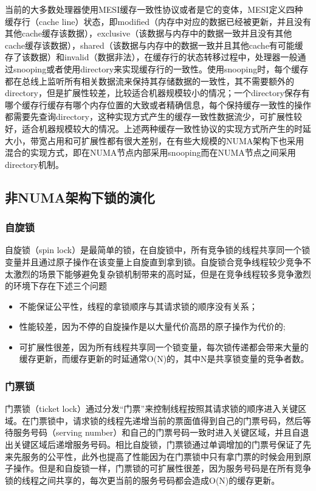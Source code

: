 当前的大多数处理器使用MESI\cite{papamarcos1984low}缓存一致性协议或者是它的变体，MESI定义四种缓存行（cache line）状态，即modified（内存中对应的数据已经被更新，并且没有其他cache缓存该数据），exclusive（该数据与内存中的数据一致并且没有其他cache缓存该数据），shared（该数据与内存中的数据一致并且其他cache有可能缓存了该数据）和invalid（数据非法），在缓存行的状态转移过程中，处理器一般通过snooping或者使用directory来实现缓存行的一致性。使用snooping时，每个缓存都在总线上监听所有相关数据流来保持其存储数据的一致性，其不需要额外的directory，但是扩展性较差，比较适合机器规模较小的情况；一个directory保存有哪个缓存行缓存有哪个内存位置的大致或者精确信息，每个保持缓存一致性的操作都需要先查询directory，这种实现方式产生的缓存一致性数据流少，可扩展性较好，适合机器规模较大的情况。上述两种缓存一致性协议的实现方式所产生的时延大小，带宽占用和可扩展性都有很大差别，在有些大规模的NUMA架构下也采用混合的实现方式，即在NUMA节点内部采用snooping而在NUMA节点之间采用directory机制。
\subsection{非NUMA架构下锁的演化}
\subsubsection{自旋锁}
自旋锁（spin lock）\cite{anderson1990performance}\cite{mellor1991algorithms}\cite{scott2013shared}是最简单的锁，在自旋锁中，所有竞争锁的线程共享同一个锁变量并且通过原子操作在该变量上自旋直到拿到锁。自旋锁合竞争线程较少竞争不太激烈的场景下能够避免复杂锁机制带来的高时延，但是在竞争线程较多竞争激烈的环境下存在下述三个问题
\begin{itemize}
\item 不能保证公平性，线程的拿锁顺序与其请求锁的顺序没有关系；
\item 性能较差，因为不停的自旋操作是以大量代价高昂的原子操作为代价的;
\item 可扩展性很差，因为所有线程共享同一个锁变量，每次锁传递都会带来大量的缓存更新，而缓存更新的时延通常O(N)的，其中N是共享锁变量的竞争者数。
\end{itemize}

\subsubsection{门票锁}
门票锁（ticket lock）\cite{mellor1991algorithms}\cite{dice2011brief}通过分发“门票”来控制线程按照其请求锁的顺序进入关键区域。在门票锁中，请求锁的线程先递增当前的票面值得到自己的门票号码，然后等待服务号码（serving number）和自己的门票号码一致时进入关键区域，并且自退出关键区域后递增服务号码。相比自旋锁，门票锁通过单调增加的门票号保证了先来先服务的公平性，此外也提高了性能因为在门票锁中只有拿门票的时候会用到原子操作。但是和自旋锁一样，门票锁的可扩展性很差，因为服务号码是在所有竞争锁的线程之间共享的，每次更当前的服务号码都会造成O(N)的缓存更新。

